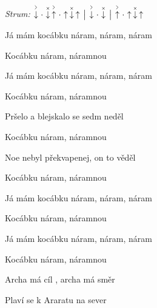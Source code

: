 \begin{song}


\begin{headerbox}
\RaiseBoxWithAccents
{} \quad
\textit{Strum:}
$\AccentDown\Miss\ChuckDown\AccentUp\Miss\Up\ChuckDown\Up \Separator
\AccentDown\Miss\ChuckDown \Separator \AccentUp\Miss\Up\ChuckDown\Up$ 
\end{headerbox}

\begin{strumbox}
\end{strumbox}

\large

\bigskip

Já mám kocábku náram, náram, náram \par
{}Kocábku náram, náramnou \par
Já mám kocábku náram, náram, náram \par
{}Kocábku náram, náramnou \par

\bigskip

Pršelo a blejskalo se sedm neděl \par
{}Kocábku náram, náramnou \par
{}Noe nebyl překvapenej, on to věděl \par
{}Kocábku náram, náramnou \par

\bigskip

\begin{chorusbox}{\Refren}
Já mám kocábku náram, náram, náram \par
{}Kocábku náram, náramnou \par
Já mám kocábku náram, náram, náram \par
{}Kocábku náram, náramnou \par

\bigskip

Archa má cíl , archa má směr \par
{}Plaví se k Araratu na sever \par


\end{chorusbox}
\end{song}
